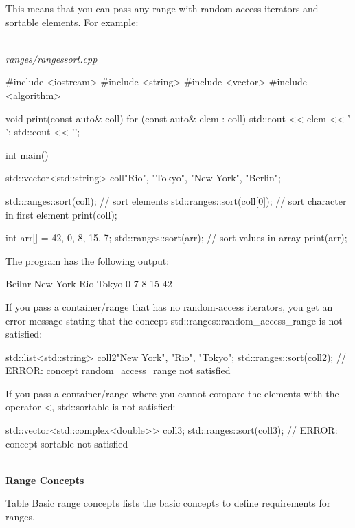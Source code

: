 This means that you can pass any range with random-access iterators and sortable elements. For example:

\noindent
\hspace*{\fill} \\ %
\textit{ranges/rangessort.cpp}

\begin{cpp}
#include <iostream>
#include <string>
#include <vector>
#include <algorithm>

void print(const auto& coll) {
	for (const auto& elem : coll) {
		std::cout << elem << ' ';
	}
	std::cout << '\n';
}

int main()
{
	std::vector<std::string> coll{"Rio", "Tokyo", "New York", "Berlin"};
	
	std::ranges::sort(coll); // sort elements
	std::ranges::sort(coll[0]); // sort character in first element
	print(coll);
	
	int arr[] = {42, 0, 8, 15, 7};
	std::ranges::sort(arr); // sort values in array
	print(arr);
}
\end{cpp}

The program has the following output:

\begin{shell}
Beilnr New York Rio Tokyo
0 7 8 15 42
\end{shell}

If you pass a container/range that has no random-access iterators, you get an error message stating that the concept std::ranges::random\_access\_range is not satisfied:

\begin{cpp}
std::list<std::string> coll2{"New York", "Rio", "Tokyo"};
std::ranges::sort(coll2); // ERROR: concept random_access_range not satisfied
\end{cpp}

If you pass a container/range where you cannot compare the elements with the operator <, std::sortable is not satisfied:

\begin{cpp}
std::vector<std::complex<double>> coll3;
std::ranges::sort(coll3); // ERROR: concept sortable not satisfied
\end{cpp}

\noindent
\hspace*{\fill} \\ %
\textbf{Range Concepts}

Table Basic range concepts lists the basic concepts to define requirements for ranges.

